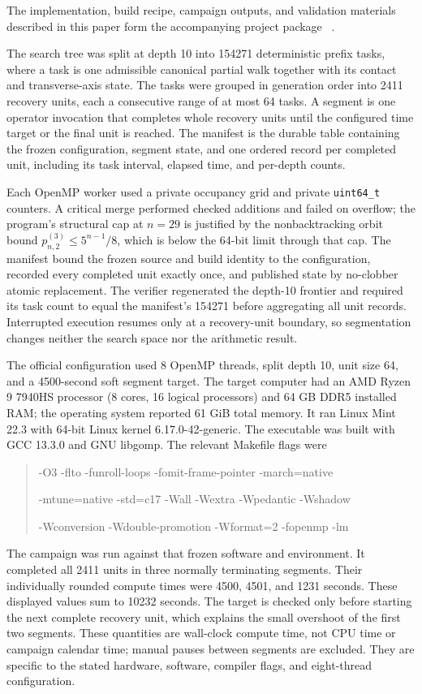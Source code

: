 \documentclass[11pt]{article}
\theoremstyle{definition}
\theoremstyle{remark}
\begin{document}
The implementation, build recipe, campaign outputs, and validation materials
described in this paper form the accompanying project package~
\cite{CortiPackage2026}.

The search tree was split at depth 10 into 154271 deterministic prefix tasks,
where a task is one admissible canonical partial walk together with its
contact and transverse-axis state.  The tasks were grouped in generation order
into 2411 recovery units, each a consecutive range of at most 64 tasks.  A
segment is one operator invocation that completes whole recovery units until
the configured time target or the final unit is reached.  The manifest is the
durable table containing the frozen configuration, segment state, and one
ordered record per completed unit, including its task interval, elapsed time,
and per-depth counts.

Each OpenMP worker used a private occupancy grid and private
\texttt{uint64\_t} counters.  A critical merge performed checked additions and
failed on overflow; the program's structural cap at $n=29$ is justified by the
nonbacktracking orbit bound $p_{n,2}^{(3)}\leq5^{n-1}/8$, which is below the
64-bit limit through that cap.  The manifest bound the frozen source and build
identity to the configuration, recorded every completed unit exactly once,
and published state by no-clobber atomic replacement.  The verifier regenerated
the depth-10 frontier and required its task count to equal the manifest's
154271 before aggregating all unit records.  Interrupted execution resumes
only at a recovery-unit boundary, so segmentation changes neither the search
space nor the arithmetic result.

The official configuration used 8 OpenMP threads, split depth 10, unit size 64,
and a 4500-second soft segment target.  The target computer had an AMD Ryzen 9
7940HS processor (8 cores, 16 logical processors) and 64 GB DDR5 installed RAM;
the operating system reported 61 GiB total memory.  It ran Linux Mint 22.3
with 64-bit Linux kernel 6.17.0-42-generic.  The executable was built with GCC
13.3.0 and GNU libgomp.  The relevant Makefile flags were
\begin{quote}
\small\ttfamily
-O3 -flto -funroll-loops -fomit-frame-pointer -march=native\par
-mtune=native -std=c17 -Wall -Wextra -Wpedantic -Wshadow\par
-Wconversion -Wdouble-promotion -Wformat=2 -fopenmp -lm
\end{quote}

The campaign was run against that frozen software and environment.
It completed all 2411 units in three normally terminating segments.
Their individually rounded compute times were 4500, 4501, and 1231 seconds.  These displayed values sum to 10232 seconds.  The target is checked
only before starting the next complete recovery unit, which explains the
small overshoot of the first two segments.  These quantities are wall-clock
compute time, not CPU time or campaign calendar time; manual pauses between
segments are excluded.  They are specific to the stated hardware, software,
compiler flags, and eight-thread configuration.
\end{document}
